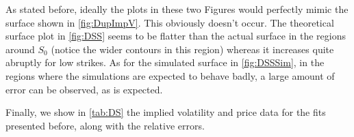 As stated before, ideally the plots in these two Figures would perfectly mimic the surface shown in \autoref{fig:DupImpV}. This obviously doesn't occur. The theoretical surface plot in \autoref{fig:DSS} seems to be flatter than the actual surface in the regions around $S_0$ (notice the wider contours in this region) whereas it increases quite abruptly for low strikes.
As for the simulated surface in \autoref{fig:DSSSim}, in the regions where the simulations are expected to behave badly, a large amount of error can be observed, as is expected.


\vspace{\fill}
\newpage

Finally, we show in \autoref{tab:DS} the implied volatility and price data for the fits presented before, along with the relative errors.

